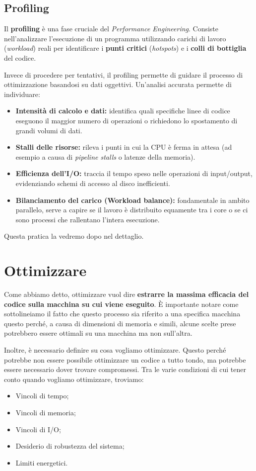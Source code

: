 \subsection{Profiling}
Il \textbf{profiling} è una fase cruciale del \textit{Performance Engineering}. Consiste nell'analizzare l'esecuzione di un programma utilizzando carichi di lavoro (\textit{workload}) reali per identificare i \textbf{punti critici} (\textit{hotspots}) e i \textbf{colli di bottiglia} del codice. 

Invece di procedere per tentativi, il profiling permette di guidare il processo di ottimizzazione basandosi su dati oggettivi. Un'analisi accurata permette di individuare:

\begin{itemize}
    \item \textbf{Intensità di calcolo e dati:} identifica quali specifiche linee di codice eseguono il maggior numero di operazioni o richiedono lo spostamento di grandi volumi di dati.
    \item \textbf{Stalli delle risorse:} rileva i punti in cui la CPU è ferma in attesa (ad esempio a causa di \textit{pipeline stalls} o latenze della memoria).
    \item \textbf{Efficienza dell'I/O:} traccia il tempo speso nelle operazioni di input/output, evidenziando schemi di accesso al disco inefficienti.
    \item \textbf{Bilanciamento del carico (Workload balance):} fondamentale in ambito parallelo, serve a capire se il lavoro è distribuito equamente tra i core o se ci sono processi che rallentano l'intera esecuzione.
\end{itemize}
Questa pratica la vedremo dopo nel dettaglio.

\section{Ottimizzare}
Come abbiamo detto, ottimizzare vuol dire \textbf{estrarre la massima efficacia del codice sulla macchina su cui viene eseguito}. È importante notare come sottolineiamo il fatto che questo processo sia riferito a una specifica macchina questo perché, a causa di dimensioni di memoria e simili, alcune scelte prese potrebbero essere ottimali su una macchina ma non sull'altra.

Inoltre, è necessario definire su cosa vogliamo ottimizzare. Questo perché potrebbe non essere possibile ottimizzare un codice a tutto tondo, ma potrebbe essere necessario dover trovare compromessi. Tra le varie condizioni di cui tener conto quando vogliamo ottimizzare, troviamo:
\begin{itemize}
    \item Vincoli di tempo;
    \item Vincoli di memoria;
    \item Vincoli di I/O;
    \item Desiderio di robustezza del sistema;
    \item Limiti energetici.
\end{itemize} 

